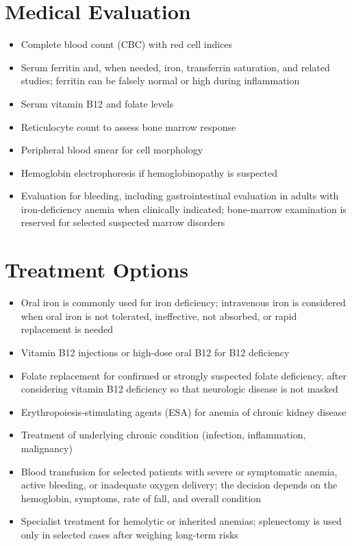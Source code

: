 \section*{Medical Evaluation}
\begin{itemize}
\item Complete blood count (CBC) with red cell indices
\item Serum ferritin and, when needed, iron, transferrin saturation, and related studies; ferritin can be falsely normal or high during inflammation
\item Serum vitamin B12 and folate levels
\item Reticulocyte count to assess bone marrow response
\item Peripheral blood smear for cell morphology
\item Hemoglobin electrophoresis if hemoglobinopathy is suspected
\item Evaluation for bleeding, including gastrointestinal evaluation in adults with iron-deficiency anemia when clinically indicated; bone-marrow examination is reserved for selected suspected marrow disorders
\end{itemize}

\section*{Treatment Options}
\begin{itemize}
\item Oral iron is commonly used for iron deficiency; intravenous iron is considered when oral iron is not tolerated, ineffective, not absorbed, or rapid replacement is needed
\item Vitamin B12 injections or high-dose oral B12 for B12 deficiency
\item Folate replacement for confirmed or strongly suspected folate deficiency, after considering vitamin B12 deficiency so that neurologic disease is not masked
\item Erythropoiesis-stimulating agents (ESA) for anemia of chronic kidney disease
\item Treatment of underlying chronic condition (infection, inflammation, malignancy)
\item Blood transfusion for selected patients with severe or symptomatic anemia, active bleeding, or inadequate oxygen delivery; the decision depends on the hemoglobin, symptoms, rate of fall, and overall condition
\item Specialist treatment for hemolytic or inherited anemias; splenectomy is used only in selected cases after weighing long-term risks
\end{itemize}

